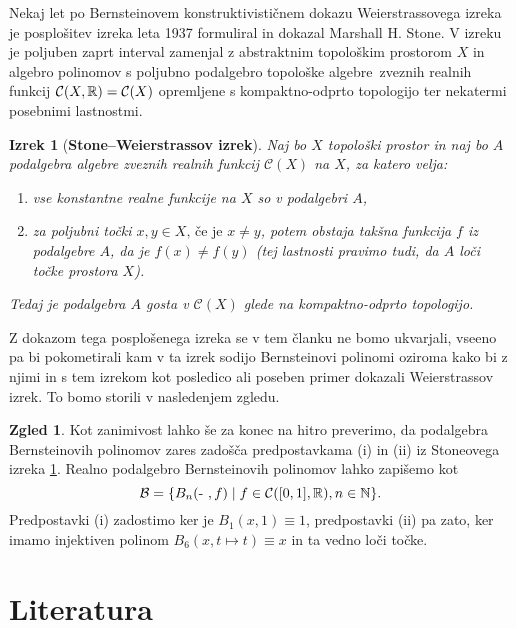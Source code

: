 \documentclass[a4paper, reqno]{amsart}
\theoremstyle{theorem}
\newtheorem{izrek}{Izrek}[section]
\theoremstyle{definition}
\newtheorem*{zgled*}{Zgled}
\begin{document}
\par
Nekaj let po Bernsteinovem konstruktivističnem dokazu Weierstrassovega
izreka je posplošitev izreka leta 1937 formuliral in dokazal
Marshall H. Stone. V izreku je poljuben zaprt interval zamenjal z abstraktnim
topološkim prostorom $X$ in algebro polinomov s poljubno podalgebro
topološke algebre zveznih realnih funkcij $\mathcal{C}(X, \mathbb{R}) = \mathcal{C}(X)$
opremljene s
kompaktno-odprto topologijo ter nekatermi posebnimi lastnostmi.

\renewcommand{\labelenumi}{(\roman{enumi})}

\begin{izrek}[\textbf{Stone--Weierstrassov izrek}]
	\label{Stone} %
	Naj bo $X$ topološki prostor in naj bo $A$ podalgebra algebre zveznih
	realnih funkcij $\mathcal{C}(X)$ na $X$, za katero velja:
	\begin{enumerate}
		\item vse konstantne realne funkcije na $X$ so v podalgebri $A$,
		\item za poljubni točki $x, y \in X\text{, če je } x \neq y$, potem obstaja takšna
					funkcija $f$ iz podalgebre $A$, da je $f(x) \neq f(y)$ (tej
					lastnosti pravimo tudi, da $A$ loči točke prostora $X$). 
	\end{enumerate}
	Tedaj je podalgebra $A$ gosta v $\mathcal{C}(X)$ glede na kompaktno-odprto
	topologijo.
\end{izrek}

\par
Z dokazom tega posplošenega izreka se v tem članku ne bomo ukvarjali, vseeno
pa bi pokometirali kam v ta izrek sodijo Bernsteinovi polinomi oziroma kako
bi z njimi in s tem izrekom kot posledico ali poseben primer dokazali 
Weierstrassov izrek. To bomo storili v nasledenjem zgledu.

\begin{zgled*}
	Kot zanimivost lahko še za konec na hitro preverimo, da podalgebra Bernsteinovih
	polinomov zares zadošča predpostavkama (i) in (ii) iz Stoneovega izreka 
	\ref{Stone}. Realno podalgebro Bernsteinovih polinomov lahko zapišemo kot
	$$
	\mathcal{B} = \{B_n(\text{- }, f) \mid f \in \mathcal{C}([0,1],\mathbb{R}), n \in \mathbb{N}\}\text{.}
	$$
	Predpostavki (i) zadostimo ker je $B_1(x, 1) \equiv 1$, predpostavki (ii) pa zato,
	ker imamo injektiven polinom $B_6(x, t \mapsto t) \equiv x$ in ta vedno loči točke.
\end{zgled*}



\newpage
\section{Literatura}
\end{document}
